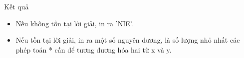 Kết quả  
\begin{itemize}
	\item     Nếu không tồn tại lời giải, in ra 'NIE'.   
	\item     Nếu tồn tại lời giải, in ra một số nguyên dương, là số lượng nhỏ nhất các phép toán * cần để tương đương hóa hai từ x và y.   
\end{itemize}
